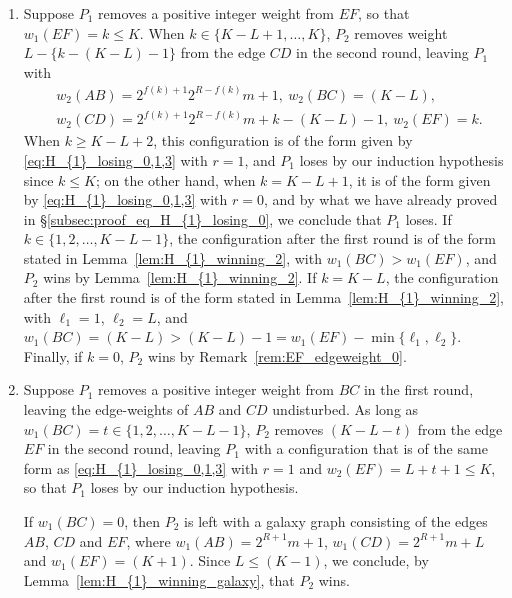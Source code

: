 \documentclass[11pt,reqno]{amsart}
\theoremstyle{definition}
\theoremstyle{definition}
\begin{document}
\begin{enumerate}
\begin{enumerate}
\item If $w_{1}(AB)=2^{R+1}m$ and $w_{1}(BC)=0$, $P_{2}$ is left with a galaxy graph comprising the edges $AB$, $CD$ and $EF$, where $w_{1}(AB)=2^{R+1}m$, $w_{1}(CD)=2^{R+1}m+L$ and $w_{1}(EF)=(K+1)$, and as $L\leqslant (K-1)<(K+1)$, $P_{2}$ wins by Lemma~\ref{lem:H_{1}_winning_galaxy}.

\item Suppose $w_{1}(AB)=2^{R+1}n+\ell_{1}$ for some $n < m$ and some $\ell_{1} \in \{0,1,\ldots,2^{R+1}-1\}$. The resulting configuration is of the form given by Lemma~\ref{prop:H_{1}_winning_1}, with $m_{1}=n$, $m_{2}=m$ and $\ell_{2}=L$, and as $n<m \implies m_{1}\neq m_{2}$, hence $P_{2}$ wins.
\end{enumerate}

\item Suppose $P_{1}$ removes a positive integer weight from $EF$, so that $w_{1}(EF)=k\leqslant K$. When $k \in \{K-L+1,\ldots,K\}$, $P_{2}$ removes weight $L-\{k-(K-L)-1\}$ from the edge $CD$ in the second round, leaving $P_{1}$ with 
\begin{align}
{}&w_{2}(AB)=2^{f(k)+1}2^{R-f(k)}m+1,\ w_{2}(BC)=(K-L),\nonumber\\
{}&w_{2}(CD)=2^{f(k)+1}2^{R-f(k)}m+k-(K-L)-1,\ w_{2}(EF)=k.\nonumber
\end{align}
When $k \geqslant K-L+2$, this configuration is of the form given by \eqref{eq:H_{1}_losing_0,1,3} with $r=1$, and $P_{1}$ loses by our induction hypothesis since $k \leqslant K$; on the other hand, when $k=K-L+1$, it is of the form given by \eqref{eq:H_{1}_losing_0,1,3} with $r=0$, and by what we have already proved in \S\ref{subsec:proof_eq_H_{1}_losing_0}, we conclude that $P_{1}$ loses. If $k\in \{1,2,\ldots,K-L-1\}$, the configuration after the first round is of the form stated in Lemma~\ref{lem:H_{1}_winning_2}, with $w_{1}(BC)>w_{1}(EF)$, and $P_{2}$ wins by Lemma~\ref{lem:H_{1}_winning_2}. If $k=K-L$, the configuration after the first round is of the form stated in Lemma~\ref{lem:H_{1}_winning_2}, with $\ell_{1}=1$, $\ell_{2}=L$, and $w_{1}(BC)=(K-L)>(K-L)-1=w_{1}(EF)-\min\{\ell_{1},\ell_{2}\}$. Finally, if $k=0$, $P_{2}$ wins by Remark~\ref{rem:EF_edgeweight_0}.


\item Suppose $P_{1}$ removes a positive integer weight from $BC$ in the first round, leaving the edge-weights of $AB$ and $CD$ undisturbed. As long as $w_{1}(BC)=t \in \{1,2,\ldots,K-L-1\}$, $P_{2}$ removes $(K-L-t)$ from the edge $EF$ in the second round, leaving $P_{1}$ with a configuration that is of the same form as \eqref{eq:H_{1}_losing_0,1,3} with $r=1$ and $w_{2}(EF)=L+t+1\leqslant K$, so that $P_{1}$ loses by our induction hypothesis. 

If $w_{1}(BC)=0$, then $P_{2}$ is left with a galaxy graph consisting of the edges $AB$, $CD$ and $EF$, where $w_{1}(AB)=2^{R+1}m+1$, $w_{1}(CD)=2^{R+1}m+L$ and $w_{1}(EF)=(K+1)$. Since $L\leqslant (K-1)$, we conclude, by Lemma~\ref{lem:H_{1}_winning_galaxy}, that $P_{2}$ wins.
\end{enumerate}
\end{document}
